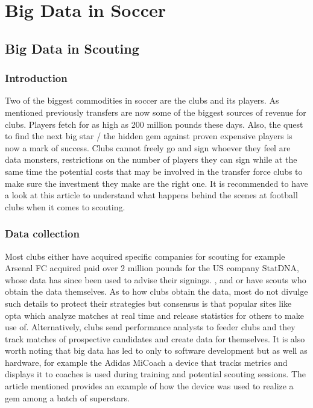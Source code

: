 \documentclass[sigconf]{acmart}
\begin{document}
\section{Big Data in Soccer}
\subsection{Big Data in Scouting}

\subsubsection{Introduction}

Two of the biggest commodities in soccer are the clubs and its players. As mentioned previously transfers are now some of the biggest sources of revenue for clubs. Players fetch for as high as 200 million pounds these days\cite{wikipedia}. Also, the quest to find the next big star / the hidden gem against proven expensive players is now a mark of success. Clubs cannot freely go and sign whoever they feel are data monsters, restrictions on the number of players they can sign while at the same time the potential costs that may be involved in the transfer force clubs to make sure the investment they make are the right one. It is recommended to have a look at this article to understand what happens behind the scenes at football clubs when it comes to scouting\cite{2012}.

\subsubsection{Data collection}

Most clubs either have acquired specific companies for scouting for example Arsenal FC acquired paid over 2 million pounds for the US company StatDNA, whose data has since been used to advise their signings. \cite{Outsideoftheboot2000}, and or have scouts who obtain the data themselves. As to how clubs obtain the data, most do not divulge such details to protect their strategies but consensus is that popular sites like opta which analyze matches at real time and release statistics for others to make use of\cite{Optasports2000}. Alternatively, clubs send performance analysts to feeder clubs and they track matches of prospective candidates and create data for themselves.\newline
It is also worth noting that big data has led to only to software development but as well as hardware, for example the Adidas MiCoach a device that tracks metrics and displays it to coaches is used during training and potential scouting sessions. The article mentioned provides an example of how the device was used to realize a gem among a batch of superstars.\cite{2000}
\end{document}
